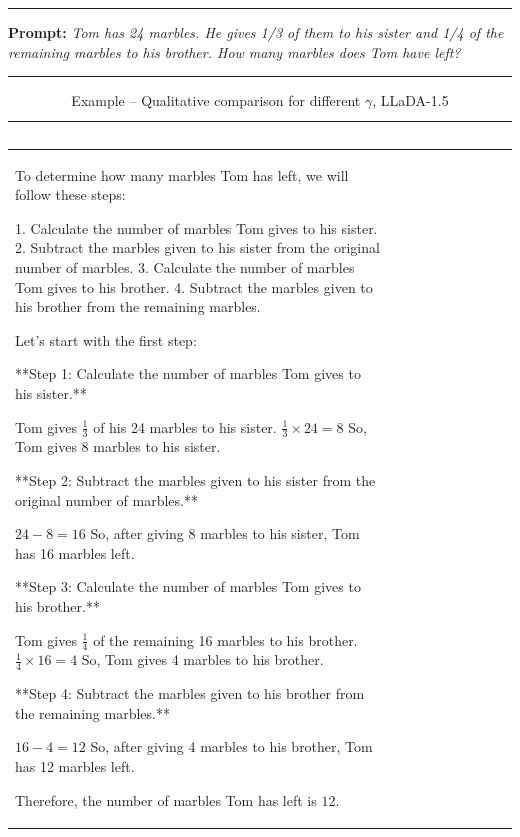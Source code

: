 \documentclass{article} %
\theoremstyle{definition}
\theoremstyle{remark}
\begin{document}
\begin{table}[h]
\centering
\caption{Example -- Qualitative comparison for different $\gamma$, LLaDA-1.5}
\vspace{0.3cm}

\noindent\rule{\textwidth}{0.4pt}
\textbf{Prompt:} \textit{Tom has 24 marbles. He gives 1/3 of them to his sister and 1/4 of the remaining marbles to his brother. How many marbles does Tom have left?}
\noindent\rule{\textwidth}{0.4pt}

\vspace{0.5cm}

\begin{tabular}{|>{\columncolor{lightblue}}p{5cm}|>{\columncolor{lightgreen}}p{5cm}|>{\columncolor{lightpink}}p{5cm}|}
\hline
\rowcolor{headercolor}
\textcolor{white}{\textbf{$\gamma = 0.5$}} & \textcolor{white}{\textbf{$\gamma = 0.7$}} & \textcolor{white}{\textbf{$\gamma = 0.95$}} \\
\hline
\footnotesize
To determine how many marbles Tom has left, we will follow these steps:

1. Calculate the number of marbles Tom gives to his sister.
2. Subtract the marbles given to his sister from the original number of marbles.
3. Calculate the number of marbles Tom gives to his brother.
4. Subtract the marbles given to his brother from the remaining marbles.

Let's start with the first step:

**Step 1: Calculate the number of marbles Tom gives to his sister.**

Tom gives $\frac{1}{3}$ of his 24 marbles to his sister.
$\frac{1}{3} \times 24 = 8$
So, Tom gives 8 marbles to his sister.

**Step 2: Subtract the marbles given to his sister from the original number of marbles.**

$24 - 8 = 16$
So, after giving 8 marbles to his sister, Tom has 16 marbles left.

**Step 3: Calculate the number of marbles Tom gives to his brother.**

Tom gives $\frac{1}{4}$ of the remaining 16 marbles to his brother.
$\frac{1}{4} \times 16 = 4$
So, Tom gives 4 marbles to his brother.

**Step 4: Subtract the marbles given to his brother from the remaining marbles.**

$16 - 4 = 12$
So, after giving 4 marbles to his brother, Tom has 12 marbles left.

Therefore, the number of marbles Tom has left is $\boxed{12}$.


\end{tabular}
\end{table}
\end{document}
